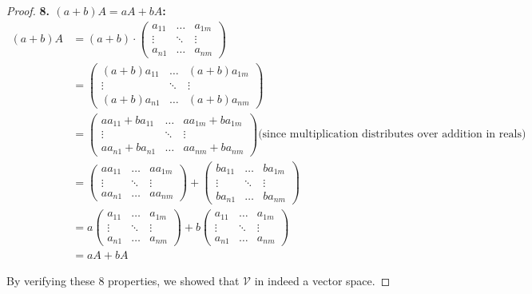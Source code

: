 \documentclass{article}
\begin{document}
\begin{proof}
\textbf{8. $(a+b)A = aA+bA$:}
\begin{align*}
(a+b)A &= (a+b)\cdot \begin{pmatrix} a_{11} & \ldots & a_{1m} \\ \vdots &  \ddots & \vdots \\ a_{n1} &  \ldots & a_{nm} \end{pmatrix}\\
&= \begin{pmatrix} (a+b)a_{11} & \ldots & (a+b)a_{1m} \\ \vdots &  \ddots & \vdots \\ (a+b)a_{n1} &  \ldots & (a+b)a_{nm} \end{pmatrix} \\
&= \begin{pmatrix} aa_{11}+ba_{11} & \ldots & aa_{1m}+ba_{1m} \\ \vdots &  \ddots & \vdots \\ aa_{n1}+ba_{n1} &  \ldots & aa_{nm}+ba_{nm} \end{pmatrix} \text{(since multiplication distributes over addition in reals)} \\
&= \begin{pmatrix} aa_{11} & \ldots & aa_{1m} \\ \vdots &  \ddots & \vdots \\ aa_{n1} &  \ldots & aa_{nm} \end{pmatrix} + \begin{pmatrix} ba_{11} & \ldots & ba_{1m} \\ \vdots &  \ddots & \vdots \\ ba_{n1} &  \ldots & ba_{nm} \end{pmatrix} \\
&= a\begin{pmatrix} a_{11} & \ldots & a_{1m} \\ \vdots &  \ddots & \vdots \\ a_{n1} &  \ldots & a_{nm} \end{pmatrix} + b\begin{pmatrix} a_{11} & \ldots & a_{1m} \\ \vdots &  \ddots & \vdots \\ a_{n1} &  \ldots & a_{nm} \end{pmatrix}\\
&= aA +bA
\end{align*}
\smallskip

By verifying these 8 properties, we showed that $\mathcal{V}$ in indeed a vector space. 


\end{proof}
\end{document}
